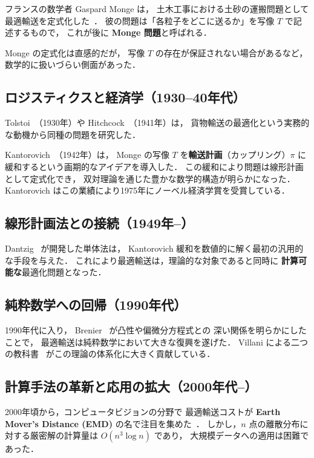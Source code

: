 フランスの数学者 Gaspard Monge は，
土木工事における土砂の運搬問題として最適輸送を定式化した~\cite{Monge1781}．
彼の問題は「各粒子をどこに送るか」を写像 $T$ で記述するもので，
これが後に \textbf{Monge 問題}と呼ばれる．

Monge の定式化は直感的だが，
写像 $T$ の存在が保証されない場合があるなど，
数学的に扱いづらい側面があった．

\subsection*{ロジスティクスと経済学（1930--40年代）}

Tolstoi~\cite{Tolstoi1930}（1930年）や
Hitchcock~\cite{Hitchcock1941}（1941年）は，
貨物輸送の最適化という実務的な動機から同種の問題を研究した．

Kantorovich~\cite{Kantorovich1942}（1942年）は，
Monge の写像 $T$ を\textbf{輸送計画}（カップリング）$\pi$
に緩和するという画期的なアイデアを導入した．
この緩和により問題は線形計画として定式化でき，
双対理論を通じた豊かな数学的構造が明らかになった．
Kantorovich はこの業績により1975年にノーベル経済学賞を受賞している．

\subsection*{線形計画法との接続（1949年--）}

Dantzig~\cite{Dantzig1951} が開発した単体法は，
Kantorovich 緩和を数値的に解く最初の汎用的な手段を与えた．
これにより最適輸送は，理論的な対象であると同時に
\textbf{計算可能な}最適化問題となった．

\subsection*{純粋数学への回帰（1990年代）}

1990年代に入り，
Brenier~\cite{Brenier1991} が凸性や偏微分方程式との
深い関係を明らかにしたことで，
最適輸送は純粋数学において大きな復興を遂げた．
Villani による二つの教科書~\cite{Villani2003, Villani2009}
がこの理論の体系化に大きく貢献している．

\subsection*{計算手法の革新と応用の拡大（2000年代--）}

2000年頃から，コンピュータビジョンの分野で
最適輸送コストが \textbf{Earth Mover's Distance (EMD)}
の名で注目を集めた~\cite{Rubner2000}．
しかし，$n$ 点の離散分布に対する厳密解の計算量は $O(n^3 \log n)$ であり，
大規模データへの適用は困難であった．

